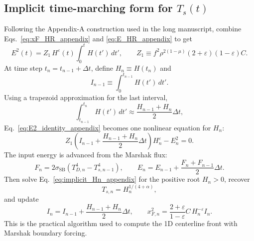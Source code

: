 \documentclass[11pt]{article}
\begin{document}
\subsection{Implicit time-marching form for $T_s(t)$}
Following the Appendix-A construction used in the long manuscript, combine Eqs.~\eqref{eq:xF_HR_appendix} and \eqref{eq:E_HR_appendix} to get
\begin{equation}
E^2(t)=Z_1\,H^{\varepsilon}(t)\int_0^t H(t')\,dt',
\qquad
Z_1\equiv f^2\rho^{2(1-\mu)}(2+\varepsilon)(1-\varepsilon)C.
\label{eq:E2_identity_appendix}
\end{equation}
At time step $t_n=t_{n-1}+\Delta t$, define $H_n\equiv H(t_n)$ and
\begin{equation}
I_{n-1}\equiv\int_0^{t_{n-1}}H(t')\,dt'.
\end{equation}
Using a trapezoid approximation for the last interval,
\begin{equation}
\int_{t_{n-1}}^{t_n}H(t')\,dt'\approx\frac{H_{n-1}+H_n}{2}\Delta t,
\end{equation}
Eq.~\eqref{eq:E2_identity_appendix} becomes one nonlinear equation for $H_n$:
\begin{equation}
Z_1\left(I_{n-1}+\frac{H_{n-1}+H_n}{2}\Delta t\right)H_n^{\varepsilon}-E_n^2=0.
\label{eq:implicit_Hn_appendix}
\end{equation}
The input energy is advanced from the Marshak flux:
\begin{equation}
F_n=2\sigma_{\mathrm{SB}}\left(T_{D,n}^4-T_{s,n-1}^4\right),
\qquad
E_n=E_{n-1}+\frac{F_n+F_{n-1}}{2}\Delta t.
\label{eq:Fn_En_appendix}
\end{equation}
Then solve Eq.~\eqref{eq:implicit_Hn_appendix} for the positive root $H_n>0$, recover
\begin{equation}
T_{s,n}=H_n^{1/(4+\alpha)},
\end{equation}
and update
\begin{equation}
I_n=I_{n-1}+\frac{H_{n-1}+H_n}{2}\Delta t,
\qquad
x_{F,n}^2=\frac{2+\varepsilon}{1-\varepsilon}C\,H_n^{-\varepsilon}I_n.
\end{equation}
This is the practical algorithm used to compute the 1D centerline front with Marshak boundary forcing.
\end{document}
